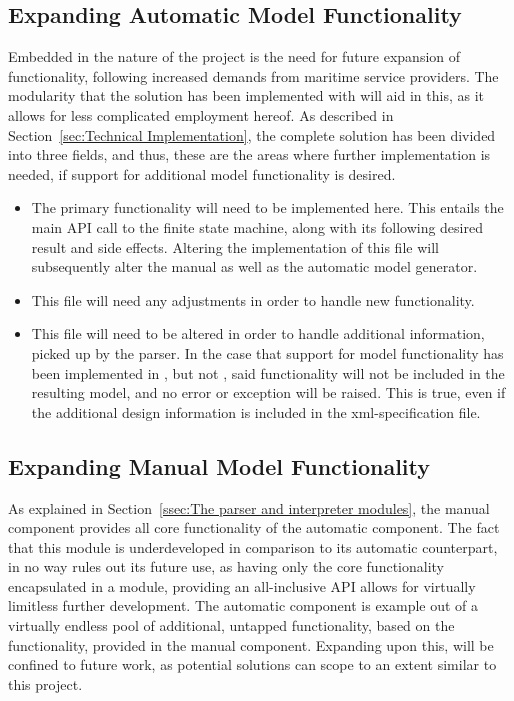 \subsection{Expanding Automatic Model Functionality}
Embedded in the nature of the project is the need for future expansion of functionality, following increased demands from maritime service providers. The modularity that the solution has been implemented with will aid in this, as it allows for less complicated employment hereof. As described in Section~\ref{sec:Technical Implementation}, the complete solution has been divided into three fields, and thus, these are the areas where further implementation is needed, if support for additional model functionality is desired.
\begin{itemize}
  \item {}
    The primary functionality will need to be implemented here. This entails the main API call to the finite state machine, along with its following desired result and side effects. Altering the implementation of this file will subsequently alter the manual as well as the automatic model generator.
  \item {}
    This file will  need any adjustments in order to handle new functionality.
  \item {}
    This file will need to be altered in order to handle additional information, picked up by the parser. In the case that support for model functionality has been implemented in , but not , said functionality will not be included in the resulting model, and no error or exception will be raised. This is true, even if the additional design information is included in the xml-specification file.
\end{itemize}

\subsection{Expanding Manual Model Functionality}
As explained in Section~\ref{ssec:The parser and interpreter modules}, the manual component provides all core functionality of the automatic component. The fact that this module is underdeveloped in comparison to its automatic counterpart, in no way rules out its future use, as having only the core functionality encapsulated in a module, providing an all-inclusive API allows for virtually limitless further development. The automatic component is  example out of a virtually endless pool of additional, untapped functionality, based on the functionality, provided in the manual component. Expanding upon this, will be confined to future work, as potential solutions can scope to an extent similar to this project.

